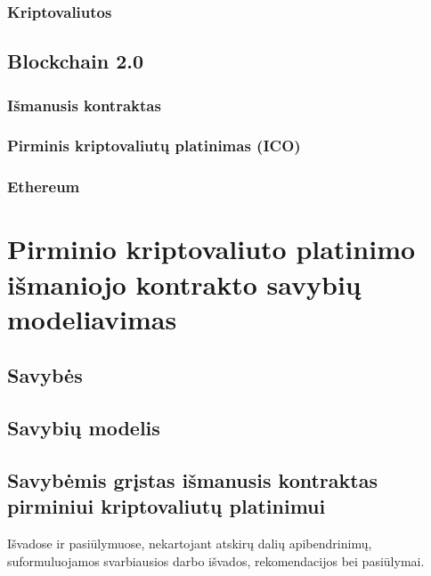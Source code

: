 \documentclass{VUMIFInfKursinis}
\begin{document}
\subsubsection{Kriptovaliutos}
\subsection{Blockchain 2.0}
\subsubsection{Išmanusis kontraktas}
\subsubsection{Pirminis kriptovaliutų platinimas (ICO)}
\subsubsection{Ethereum}
\section{Pirminio kriptovaliuto platinimo išmaniojo kontrakto savybių modeliavimas}
\subsection{Savybės}
\subsection{Savybių modelis}
\subsection{Savybėmis grįstas išmanusis kontraktas pirminiui kriptovaliutų platinimui}






Išvadose ir pasiūlymuose, nekartojant atskirų dalių apibendrinimų,
suformuluojamos svarbiausios darbo išvados, rekomendacijos bei pasiūlymai.



\printbibliography[heading=bibintoc] %

\appendix  %
%
\end{document}
